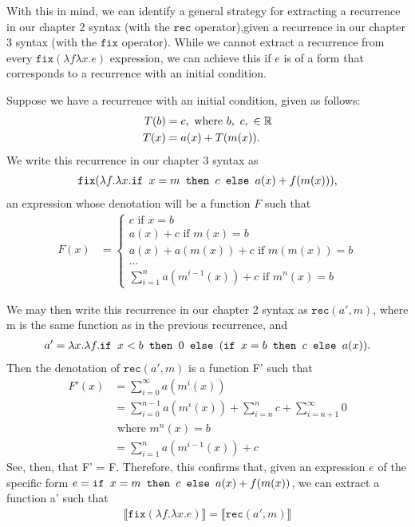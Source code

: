 With this in mind, we can identify a general strategy for extracting a recurrence in our chapter 2 syntax (with
the $\texttt{rec}$ operator),given a recurrence in our chapter 3 syntax (with the $\texttt{fix}$ operator). 
While we cannot extract a recurrence from every $\texttt{fix}(\lambda f \lambda x.e)$ expression, we can achieve this
if $e$ is of a form that corresponds to a recurrence with an initial condition. 

Suppose we have a recurrence with an initial condition, given as follows:
\begin{align*}
T(b) &= c, \text{ where } b, \ c, \ \in \mathbb{R} \\
T(x) &= a(x) + T(m(x)).
\end{align*}
We write this recurrence in our chapter 3 syntax as 
\begin{align*}
\texttt{fix}(\lambda f.\lambda x. \texttt{if } x = m \texttt{ then } c \texttt{ else } a(x) + f(m(x))),
\end{align*}
an expression whose denotation will be a function $F$ such that
\begin{align*}
F(x) &=
\begin{cases}
c \text{ if } x = b \\
a(x) + c \text{ if } m(x) = b \\
a(x) + a(m(x)) + c \text{ if } m(m(x)) = b \\
\ldots \\
\sum_{i=1}^{n} a(m^{i-1}(x)) + c \text{ if } m^n(x) = b
\end{cases}
\end{align*}

We may then write this recurrence in our chapter 2 syntax as $\texttt{rec}(a',m)$, where m is the same function
as in the previous recurrence, and
\begin{align*}
a' = \lambda x.\lambda f. \texttt{if } x < b \texttt{ then } 0 \texttt{ else } (\texttt{if } x = b \texttt{ then } c \texttt{ else } a(x)).
\end{align*}
Then the denotation of $\texttt{rec}(a',m)$ is a function F' such that 
\begin{align*}
F'(x) &= \sum_{i=0}^{\infty} a(m^i(x)) \\
&= \sum_{i=0}^{n-1} a(m^i(x)) + \sum_{i=n}^n c + \sum_{i = n+1}^{\infty} 0 \\
&\text{ where } m^n(x) = b \\
&= \sum_{i=1}^{n}a(m^{i-1}(x)) + c
\end{align*}
See, then, that F' = F. Therefore, this confirms that, given an expression $e$ of the specific form
$e = \texttt{if } x = m \texttt{ then } c \texttt{ else } a(x) + f(m(x))$, we can extract a function a' such that 
\begin{align*}
\llbracket \texttt{fix}(\lambda f. \lambda x.e) \rrbracket = \llbracket \texttt{rec}(a',m)\rrbracket
\end{align*}





 